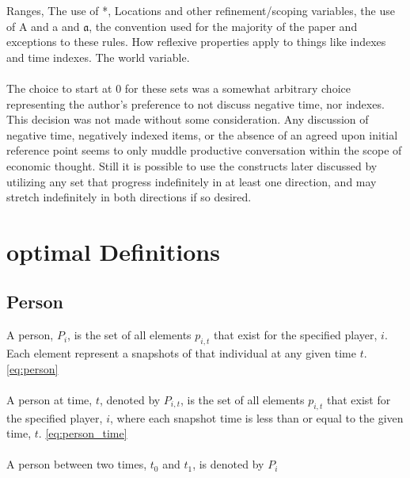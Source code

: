 \documentclass[]{article}
\begin{document}
%
Ranges, The use of *, Locations and other refinement/scoping variables, the use of A and a and $\mathfrak{a}$, the convention used for the majority of the paper and exceptions to these rules. How reflexive properties apply to things like indexes and time indexes. The world variable. 
\\
\\
The choice to start at $0$ for these sets was a somewhat arbitrary choice representing the author's preference to not discuss negative time, nor indexes. This decision was not made without some consideration. Any discussion of negative time, negatively indexed items, or the absence of an agreed upon initial reference point seems to only muddle productive conversation within the scope of economic thought. Still it is possible to use the constructs later discussed by utilizing any set that progress indefinitely in at least one direction, and may stretch indefinitely in both directions if so desired. 
%

\section*{optimal Definitions}
\subsection*{Person}
A person, $P_{i}$, is the set of all elements $p_{i,t}$ that exist for the specified player, $i$. Each element represent a snapshots of that individual at any given time $t$. \eqref{eq:person}
\\
\\
A person at time, $t$, denoted by $P_{i,t}$, is the set of all elements $p_{i,t}$ that exist for the specified player, $i$, where each snapshot time is less than or equal to the given time, $t$. \eqref{eq:person_time}
\\
\\
A person between two times, $t_{0}$ and $t_{1}$, is denoted by $P_{i}$
%

%
\end{document}
